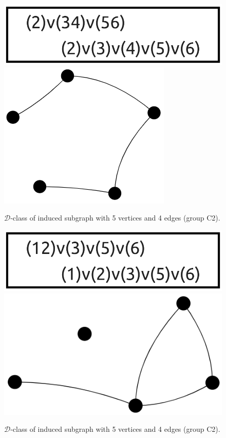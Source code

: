 \begin{appendices}
\begin{figure}[H]
\includegraphics[scale=0.12]{images/x1/x1_5v_4e_2.png}
\includegraphics[scale=0.1]{images/x1/x1_5v_4e_2_vis.png}
\caption{$\mathcal{D}$-class of induced subgraph with 5 vertices and 4 edges (group C2).}
\end{figure}

\begin{figure}[H]
\includegraphics[scale=0.12]{images/x1/x1_5v_4e.png}
\includegraphics[scale=0.1]{images/x1/x1_5v_4e_1_vis.png}
\caption{$\mathcal{D}$-class of induced subgraph with 5 vertices and 4 edges (group C2).}
\end{figure}


\end{appendices}
